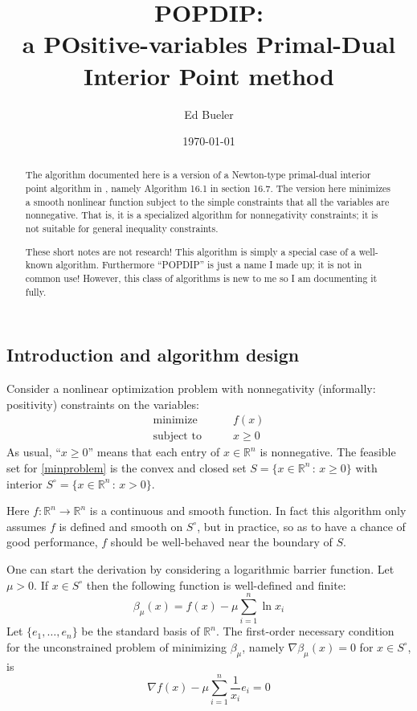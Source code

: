 \documentclass[11pt]{article}
\title{POPDIP: \\ a POsitive-variables Primal-Dual Interior Point method}
\author{Ed Bueler}
\date{\today}
\newcommand{\RR}{\mathbb{R}}
\newcommand{\grad}{\nabla}
\begin{document}
\maketitle

\begin{abstract}
The algorithm documented here is a version of a Newton-type primal-dual interior point algorithm in \cite{GrivaNashSofer2009}, namely Algorithm 16.1 in section 16.7.  The version here minimizes a smooth nonlinear function subject to the simple constraints that all the variables are nonnegative.  That is, it is a specialized algorithm for nonnegativity constraints; it is not suitable for general inequality constraints.

These short notes are not research!  This algorithm is simply a special case of a well-known algorithm.  Furthermore ``POPDIP'' is just a name I made up; it is not in common use!  However, this class of algorithms is new to me so I am documenting it fully.
\end{abstract}

\thispagestyle{empty}

\bigskip
\subsection*{Introduction and algorithm design}

Consider a nonlinear optimization problem with nonnegativity (informally: positivity) constraints on the variables:
\begin{equation}
\begin{matrix}
\text{minimize} \qquad & f(x) \\
\text{subject to} \qquad & x \ge 0
\end{matrix} \label{minproblem}
\end{equation}
As usual, ``$x\ge 0$'' means that each entry of $x\in\RR^n$ is nonnegative.  The feasible set for \eqref{minproblem} is the convex and closed set $S = \{x\in \RR^n\,:\,x\ge 0\}$ with interior $S^\circ = \{x\in \RR^n\,:\,x > 0\}$.

Here $f:\RR^n \to\RR^n$ is a continuous and smooth function.  In fact this algorithm only assumes $f$ is defined and smooth on $S^\circ$, but in practice, so as to have a chance of good performance, $f$ should be well-behaved near the boundary of $S$.

One can start the derivation by considering a logarithmic barrier function.  Let $\mu>0$.  If $x\in S^\circ$ then the following function is well-defined and finite:
\begin{equation}
\beta_\mu(x) = f(x) - \mu \sum_{i=1}^n \ln x_i \label{barrierfunction}
\end{equation}
Let $\{e_1,\dots,e_n\}$ be the standard basis of $\RR^n$.  The first-order necessary condition for the unconstrained problem of minimizing $\beta_\mu$, namely $\grad \beta_\mu(x)=0$ for $x \in S^\circ$, is
\begin{equation}
\grad f(x) - \mu \sum_{i=1}^n \frac{1}{x_i} e_i = 0 \label{firstorderbarrier}
\end{equation}
\end{document}
